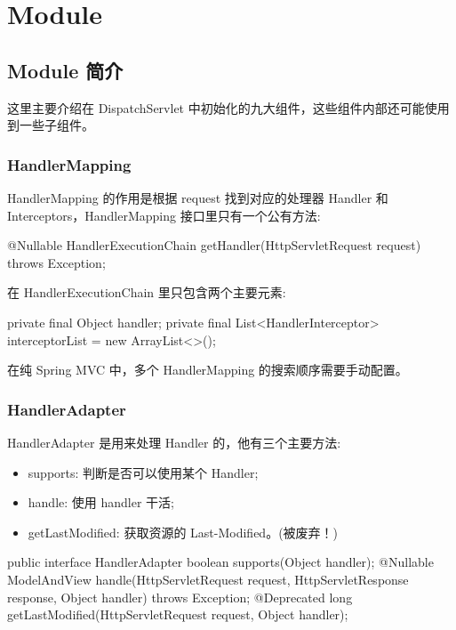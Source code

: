 \section{Module}

\subsection{Module 简介}

这里主要介绍在 DispatchServlet 中初始化的九大组件，这些组件内部还可能使用到一些子组件。

\subsubsection*{HandlerMapping}

HandlerMapping 的作用是根据 request 找到对应的处理器 Handler 和 Interceptors，HandlerMapping 接口里只有一个公有方法:

\begin{Java}
@Nullable
HandlerExecutionChain getHandler(HttpServletRequest request) throws Exception;
\end{Java}

在 HandlerExecutionChain 里只包含两个主要元素:

\begin{Java}
private final Object handler;
private final List<HandlerInterceptor> interceptorList = new ArrayList<>();
\end{Java}

在纯 Spring MVC 中，多个 HandlerMapping 的搜索顺序需要手动配置。

\subsubsection*{HandlerAdapter}

HandlerAdapter 是用来处理 Handler 的，他有三个主要方法:
\begin{itemize}
    \item supports: 判断是否可以使用某个 Handler;
    \item handle: 使用 handler 干活;
    \item getLastModified: 获取资源的 Last-Modified。(被废弃！)
\end{itemize}

\begin{Java}
public interface HandlerAdapter {
    boolean supports(Object handler);
    @Nullable
    ModelAndView handle(HttpServletRequest request, HttpServletResponse response, Object handler) throws Exception;
    @Deprecated
    long getLastModified(HttpServletRequest request, Object handler);
}
\end{Java}

